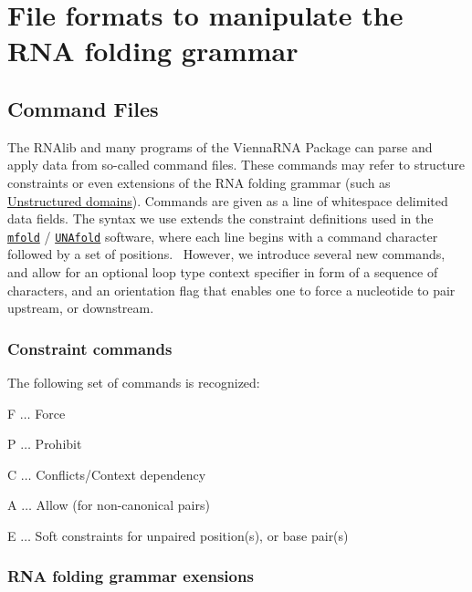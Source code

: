 \hypertarget{file_formats_constraint-formats}{}\section{File formats to manipulate the R\+N\+A folding grammar}\label{file_formats_constraint-formats}
\hypertarget{file_formats_constraint-formats-file}{}\subsection{Command Files}\label{file_formats_constraint-formats-file}
The R\+N\+Alib and many programs of the Vienna\+R\+NA Package can parse and apply data from so-\/called command files. These commands may refer to structure constraints or even extensions of the R\+NA folding grammar (such as \hyperlink{group__domains__up}{Unstructured domains}). Commands are given as a line of whitespace delimited data fields. The syntax we use extends the constraint definitions used in the \href{http://mfold.rna.albany.edu/?q=mfold}{\tt mfold} / \href{http://mfold.rna.albany.edu/?q=DINAMelt/software}{\tt U\+N\+Afold} software, where each line begins with a command character followed by a set of positions.~\newline
 However, we introduce several new commands, and allow for an optional loop type context specifier in form of a sequence of characters, and an orientation flag that enables one to force a nucleotide to pair upstream, or downstream.\hypertarget{file_formats_constraint_commands}{}\subsubsection{Constraint commands}\label{file_formats_constraint_commands}
The following set of commands is recognized\+:
\begin{DoxyItemize}
\item {\ttfamily F} $ \ldots $ Force
\item {\ttfamily P} $ \ldots $ Prohibit
\item {\ttfamily C} $ \ldots $ Conflicts/\+Context dependency
\item {\ttfamily A} $ \ldots $ Allow (for non-\/canonical pairs)
\item {\ttfamily E} $ \ldots $ Soft constraints for unpaired position(s), or base pair(s)
\end{DoxyItemize}\hypertarget{file_formats_domain_commands}{}\subsubsection{R\+N\+A folding grammar exensions}\label{file_formats_domain_commands}

